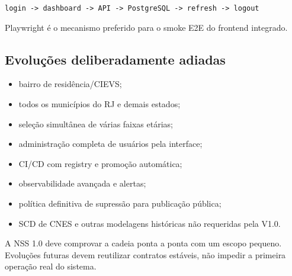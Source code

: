 \begin{center}
\texttt{login -> dashboard -> API -> PostgreSQL -> refresh -> logout}
\end{center}

Playwright é o mecanismo preferido para o smoke E2E do frontend integrado.

\subsection{Evoluções deliberadamente adiadas}

\begin{itemize}
    \item bairro de residência/CIEVS;
    \item todos os municípios do RJ e demais estados;
    \item seleção simultânea de várias faixas etárias;
    \item administração completa de usuários pela interface;
    \item CI/CD com registry e promoção automática;
    \item observabilidade avançada e alertas;
    \item política definitiva de supressão para publicação pública;
    \item SCD de CNES e outras modelagens históricas não requeridas pela V1.0.
\end{itemize}

\begin{explicacao}
A NSS 1.0 deve comprovar a cadeia ponta a ponta com um escopo pequeno. Evoluções futuras devem reutilizar contratos estáveis, não impedir a primeira operação real do sistema.
\end{explicacao}
